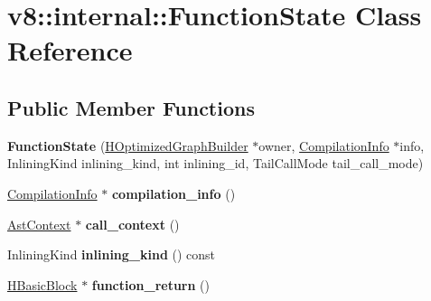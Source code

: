 \hypertarget{classv8_1_1internal_1_1_function_state}{}\section{v8\+:\+:internal\+:\+:Function\+State Class Reference}
\label{classv8_1_1internal_1_1_function_state}
\subsection*{Public Member Functions}
\begin{DoxyCompactItemize}
\item 
{\bfseries Function\+State} (\hyperlink{classv8_1_1internal_1_1_h_optimized_graph_builder}{H\+Optimized\+Graph\+Builder} $\ast$owner, \hyperlink{classv8_1_1internal_1_1_compilation_info}{Compilation\+Info} $\ast$info, Inlining\+Kind inlining\+\_\+kind, int inlining\+\_\+id, Tail\+Call\+Mode tail\+\_\+call\+\_\+mode)\hypertarget{classv8_1_1internal_1_1_function_state_a9b3865d259c37ce3fe90f617df9ff7d1}{}\label{classv8_1_1internal_1_1_function_state_a9b3865d259c37ce3fe90f617df9ff7d1}

\item 
\hyperlink{classv8_1_1internal_1_1_compilation_info}{Compilation\+Info} $\ast$ {\bfseries compilation\+\_\+info} ()\hypertarget{classv8_1_1internal_1_1_function_state_aea98f2e386d7be25b66506623448fd8a}{}\label{classv8_1_1internal_1_1_function_state_aea98f2e386d7be25b66506623448fd8a}

\item 
\hyperlink{classv8_1_1internal_1_1_ast_context}{Ast\+Context} $\ast$ {\bfseries call\+\_\+context} ()\hypertarget{classv8_1_1internal_1_1_function_state_a0b32cd6f1647d12e09dc611f0a96a20b}{}\label{classv8_1_1internal_1_1_function_state_a0b32cd6f1647d12e09dc611f0a96a20b}

\item 
Inlining\+Kind {\bfseries inlining\+\_\+kind} () const \hypertarget{classv8_1_1internal_1_1_function_state_a5ec4c820255410ac19e00a19f85a567a}{}\label{classv8_1_1internal_1_1_function_state_a5ec4c820255410ac19e00a19f85a567a}

\item 
\hyperlink{classv8_1_1internal_1_1_h_basic_block}{H\+Basic\+Block} $\ast$ {\bfseries function\+\_\+return} ()\hypertarget{classv8_1_1internal_1_1_function_state_a3137ed9f5adbd2c3438a88daa96c3b3e}{}\label{classv8_1_1internal_1_1_function_state_a3137ed9f5adbd2c3438a88daa96c3b3e}


\end{DoxyCompactItemize}
